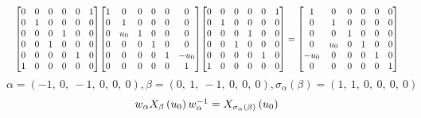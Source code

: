 \documentclass[11pt]{article}
\theoremstyle{definition}
\begin{document}
\[
\scaletoalign{\textwidth}{{\left[\begin{matrix}0 & 0 & 0 & 0 & 0 & 1\\0 & 1 & 0 & 0 & 0 & 0\\0 & 0 & 0 & 1 & 0 & 0\\0 & 0 & 1 & 0 & 0 & 0\\0 & 0 & 0 & 0 & 1 & 0\\1 & 0 & 0 & 0 & 0 & 0\end{matrix}\right]} {\left[\begin{matrix}1 & 0 & 0 & 0 & 0 & 0\\0 & 1 & 0 & 0 & 0 & 0\\0 & u_{0} & 1 & 0 & 0 & 0\\0 & 0 & 0 & 1 & 0 & 0\\0 & 0 & 0 & 0 & 1 & - u_{0}\\0 & 0 & 0 & 0 & 0 & 1\end{matrix}\right]} {\left[\begin{matrix}0 & 0 & 0 & 0 & 0 & 1\\0 & 1 & 0 & 0 & 0 & 0\\0 & 0 & 0 & 1 & 0 & 0\\0 & 0 & 1 & 0 & 0 & 0\\0 & 0 & 0 & 0 & 1 & 0\\1 & 0 & 0 & 0 & 0 & 0\end{matrix}\right]} = {\left[\begin{matrix}1 & 0 & 0 & 0 & 0 & 0\\0 & 1 & 0 & 0 & 0 & 0\\0 & 0 & 1 & 0 & 0 & 0\\0 & u_{0} & 0 & 1 & 0 & 0\\- u_{0} & 0 & 0 & 0 & 1 & 0\\0 & 0 & 0 & 0 & 0 & 1\end{matrix}\right]}}
\]
\[
\alpha = \left( -1, \  0, \  -1, \  0, \  0, \  0\right), \beta = \left( 0, \  1, \  -1, \  0, \  0, \  0\right), \sigma_{\alpha}(\beta) = \left( 1, \  1, \  0, \  0, \  0, \  0\right)
\]
\[
\scaletoalign{\textwidth}{w_{\alpha} X_{\beta}\left(u_{0}\right) w_{\alpha}^{-1} = X_{\sigma_{\alpha}\left(\beta\right)}\left(u_{0}\right)}
\]
\end{document}
